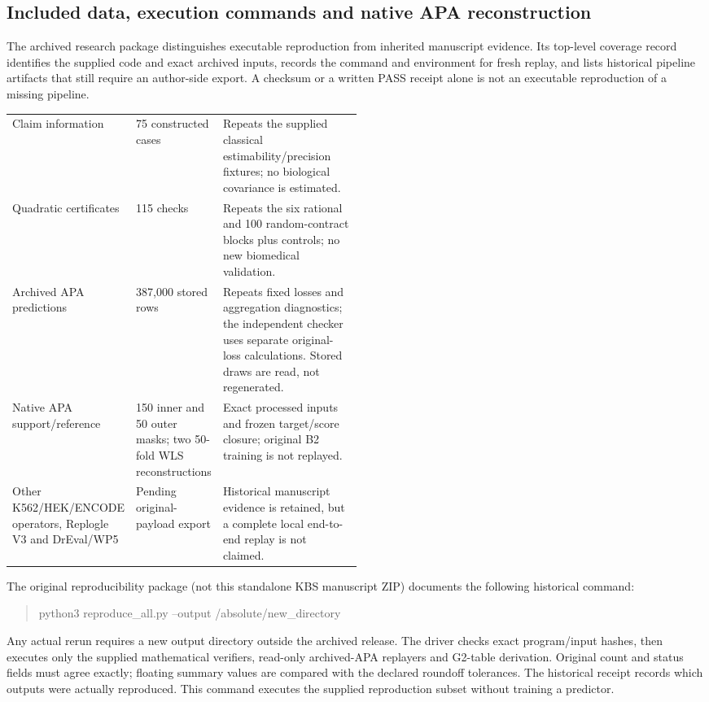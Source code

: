 \documentclass[11pt]{article}
\begin{document}
\subsection{Included data, execution commands and native APA reconstruction}
The archived research package distinguishes executable reproduction from inherited manuscript evidence. Its top-level coverage record identifies the supplied code and exact archived inputs, records the command and environment for fresh replay, and lists historical pipeline artifacts that still require an author-side export. A checksum or a written PASS receipt alone is not an executable reproduction of a missing pipeline.

\begin{center}
\small
\begin{tabularx}{\linewidth}{@{}L{0.28\linewidth}L{0.22\linewidth}X@{}}
\toprule
{} &  &  \\
\midrule
Claim information & 75 constructed cases & Repeats the supplied classical estimability/precision fixtures; no biological covariance is estimated. \\
Quadratic certificates & 115 checks & Repeats the six rational and 100 random-contract blocks plus controls; no new biomedical validation. \\
Archived APA predictions & 387,000 stored rows & Repeats fixed losses and aggregation diagnostics; the independent checker uses separate original-loss calculations. Stored draws are read, not regenerated. \\
Native APA support/reference & 150 inner and 50 outer masks; two 50-fold WLS reconstructions & Exact processed inputs and frozen target/score closure; original B2 training is not replayed. \\
Other K562/HEK/ENCODE operators, Replogle V3 and DrEval/WP5 & Pending original-payload export & Historical manuscript evidence is retained, but a complete local end-to-end replay is not claimed. \\
\bottomrule
\end{tabularx}
\end{center}

The original reproducibility package (not this standalone KBS manuscript ZIP) documents the following historical command:
\begin{quote}\small\ttfamily
python3 reproduce\_all.py --output /absolute/new\_directory
\end{quote} Any actual rerun requires a new output directory outside the archived release. The driver checks exact program/input hashes, then executes only the supplied mathematical verifiers, read-only archived-APA replayers and G2-table derivation. Original count and status fields must agree exactly; floating summary values are compared with the declared roundoff tolerances. The historical receipt records which outputs were actually reproduced. This command executes the supplied reproduction subset without training a predictor.
\end{document}
